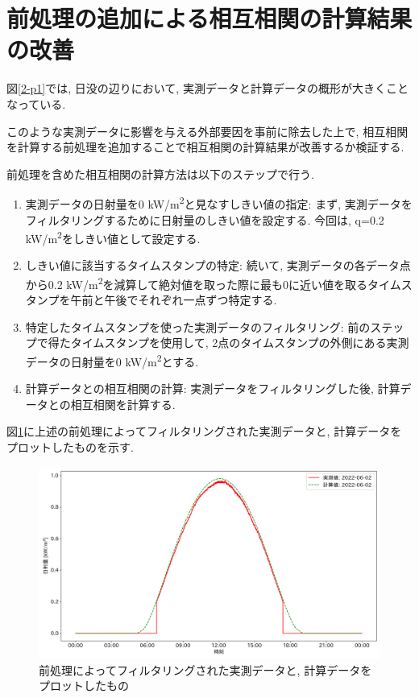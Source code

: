 \section{前処理の追加による相互相関の計算結果の改善}

図\ref{2-p1}では, 日没の辺りにおいて, 実測データと計算データの概形が大きくことなっている.

このような実測データに影響を与える外部要因を事前に除去した上で, 相互相関を計算する前処理を追加することで相互相関の計算結果が改善するか検証する.

前処理を含めた相互相関の計算方法は以下のステップで行う.

\begin{enumerate}
  \item 実測データの日射量を0 \si{\kilo\watt}/\si{\metre\squared}と見なすしきい値の指定: まず, 実測データをフィルタリングするために日射量のしきい値を設定する. 今回は, q=0.2 \si{\kilo\watt}/\si{\metre\squared}をしきい値として設定する.
  \item しきい値に該当するタイムスタンプの特定: 続いて, 実測データの各データ点から0.2 \si{\kilo\watt}/\si{\metre\squared}を減算して絶対値を取った際に最も0に近い値を取るタイムスタンプを午前と午後でそれぞれ一点ずつ特定する.
  \item 特定したタイムスタンプを使った実測データのフィルタリング: 前のステップで得たタイムスタンプを使用して, 2点のタイムスタンプの外側にある実測データの日射量を0 \si{\kilo\watt}/\si{\metre\squared}とする.
  \item 計算データとの相互相関の計算: 実測データをフィルタリングした後, 計算データとの相互相関を計算する.
\end{enumerate}

図\ref{2-p2}に上述の前処理によってフィルタリングされた実測データと, 計算データをプロットしたものを示す.

\begin{figure}[h]
  \begin{center}
    \includegraphics[width=160mm]{sotu/figure/2/drop-under-0.2-q.png}
    \caption{前処理によってフィルタリングされた実測データと, 計算データをプロットしたもの}
    \label{2-p2}
  \end{center}
\end{figure}


